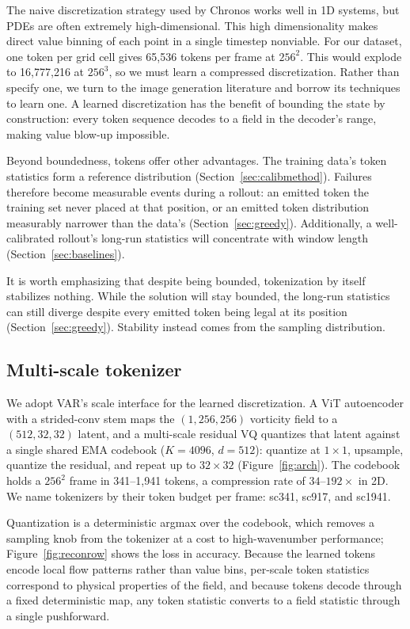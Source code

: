 \documentclass{article}
\begin{document}
The naive discretization strategy used by Chronos works well in 1D systems, but PDEs are often extremely high-dimensional.
This high dimensionality makes direct value binning of each point in a single timestep nonviable. For our dataset, one token
per grid cell gives 65{,}536 tokens per frame at $256^2$. This would explode to 16{,}777{,}216 at $256^3$, so we must learn a
compressed discretization. Rather than specify one, we turn to the image generation literature and borrow its techniques to learn one.
A learned discretization has the benefit of bounding the state by construction: every token sequence decodes to a field in the decoder's range,
making value blow-up impossible.

Beyond boundedness, tokens offer other advantages. The training data's token statistics form a reference distribution (Section~\ref{sec:calibmethod}).
Failures therefore become measurable events during a rollout: an emitted token the training set never placed at that position, or an emitted token
distribution measurably narrower than the data's (Section~\ref{sec:greedy}). Additionally, a well-calibrated rollout's long-run statistics will
concentrate with window length (Section~\ref{sec:baselines}).

It is worth emphasizing that despite being bounded, tokenization by itself stabilizes nothing. While the solution will stay bounded, the long-run statistics
can still diverge despite every emitted token being legal at its position (Section~\ref{sec:greedy}). Stability instead comes from the sampling distribution.

\subsection{Multi-scale tokenizer}
\label{sec:tokenizer}

We adopt VAR's scale interface for the learned discretization. A ViT autoencoder with a
strided-conv stem maps the $(1,256,256)$ vorticity field to a $(512,32,32)$ latent, and a
multi-scale residual VQ quantizes that latent against a single shared EMA codebook
($K{=}4096$, $d{=}512$): quantize at $1{\times}1$, upsample, quantize the residual, and
repeat up to $32{\times}32$ (Figure~\ref{fig:arch}). The codebook holds a $256^2$ frame in
341--1{,}941 tokens, a compression rate of $34$--$192{\times}$ in 2D. We name tokenizers by
their token budget per frame: sc341, sc917, and sc1941.

Quantization is a deterministic argmax over the codebook, which removes a sampling knob
from the tokenizer at a cost to high-wavenumber performance; Figure~\ref{fig:reconrow}
shows the loss in accuracy. Because the learned tokens encode local flow patterns rather
than value bins, per-scale token statistics correspond to physical properties of the
field, and because tokens decode through a fixed deterministic map, any token statistic
converts to a field statistic through a single pushforward.
\end{document}
